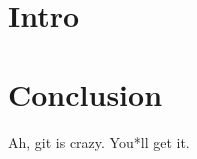 \documentclass{article}
\begin{document}
	\maketitle
	\section{Intro}
	\section{Conclusion}
	Ah, git is crazy. You*ll get it.
\end{document}
